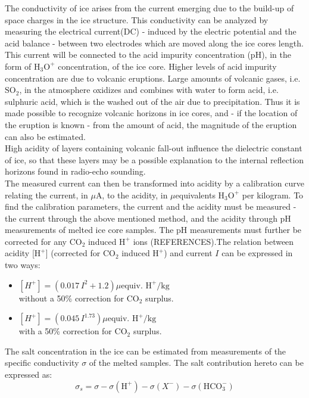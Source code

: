 \documentclass[../../CompleteThesis/Complete_1stDraft.tex]{subfiles}
\begin{document}
The conductivity of ice arises from the current emerging due to the build-up of space charges in the ice structure. This conductivity can be analyzed by measuring the electrical current(DC) - induced by the electric potential and the acid balance - between two electrodes which are moved along the ice cores length. This current will be connected to the acid impurity concentration (pH), in the form of $\text{H}_3\text{O}^+$ concentration, of the ice core. Higher levels of acid impurity concentration are due to volcanic eruptions. Large amounts of volcanic gases, i.e. $\text{SO}_2$, in the atmosphere oxidizes and combines with water to form acid, i.e. sulphuric acid, which is the washed out of the air due to precipitation. Thus it is made possible to recognize volcanic horizons in ice cores, and - if the location of the eruption is known - from the amount of acid, the magnitude of the eruption can also be estimated.\\
High acidity of layers containing volcanic fall-out influence the dielectric constant of ice, so that these layers may be a possible explanation to the internal reflection horizons found in radio-echo sounding. \\
The measured current can then be transformed into acidity by a calibration curve relating the current, in $\mu$A, to the acidity, in $\mu$equivalents $\text{H}_3\text{O}^+$ per kilogram. To find the calibration parameters, the current and the acidity must be measured - the current through the above mentioned method, and the acidity through pH measurements of melted ice core samples. The pH measurements must further be corrected for any $\text{CO}_2$ induced $\text{H}^+$ ions (REFERENCES).The relation between acidity [$\text{H}^+$] (corrected for $\text{CO}_2$ induced $\text{H}^+$) and current $I$ can be expressed in two ways:
\begin{itemize}
	\item $[H^+] = (0.017\, I^2 + 1.2) \mu \text{equiv. H}^+ /\text{kg}$\\
	without a 50\% correction for $\text{CO}_2$ surplus.
	\item $[H^+] = (0.045\, I^{1.73}) \mu \text{equiv. H}^+ /\text{kg}$\\
	with a 50\% correction for $\text{CO}_2$ surplus.
\end{itemize}
The salt concentration in the ice can be estimated from measurements of the specific conductivity $\sigma$ of the melted samples. The salt contribution hereto can be expressed as:
\begin{equation}
	\sigma_s = \sigma - \sigma(\text{H}^+) - \sigma(X^-) - \sigma(\text{HCO}_3^-)
\end{equation}
\end{document}
